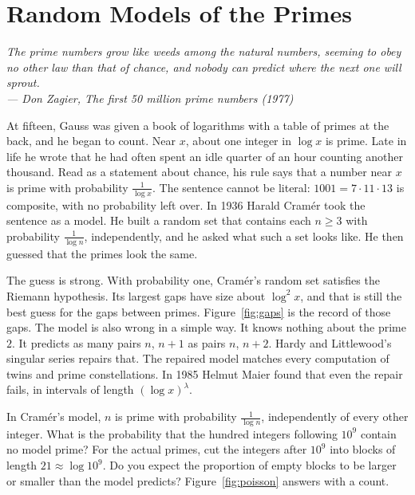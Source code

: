 \chapter{Random Models of the Primes}\label{ch:random}

\begin{center}\itshape
The prime numbers grow like weeds among the natural numbers, seeming to obey no other law than that of chance, and nobody can predict where the next one will sprout.\\
\upshape --- Don Zagier, \emph{The first 50 million prime numbers} (1977)
\end{center}

At fifteen, Gauss was given a book of logarithms with a table of primes at the back, and he began to count. Near $x$, about one integer in $\log x$ is prime. Late in life he wrote that he had often spent an idle quarter of an hour counting another thousand. Read as a statement about chance, his rule says that a number near $x$ is prime with probability $\frac1{\log x}$. The sentence cannot be literal: $1001=7\cdot11\cdot13$ is composite, with no probability left over. In 1936 Harald Cramér took the sentence as a model. He built a random set that contains each $n\ge3$ with probability $\frac1{\log n}$, independently, and he asked what such a set looks like. He then guessed that the primes look the same.

The guess is strong. With probability one, Cramér's random set satisfies the Riemann hypothesis. Its largest gaps have size about $\log^2 x$, and that is still the best guess for the gaps between primes. Figure~\ref{fig:gaps} is the record of those gaps. The model is also wrong in a simple way. It knows nothing about the prime $2$. It predicts as many pairs $n$, $n+1$ as pairs $n$, $n+2$. Hardy and Littlewood's singular series repairs that. The repaired model matches every computation of twins and prime constellations. In 1985 Helmut Maier found that even the repair fails, in intervals of length $(\log x)^\lambda$.

\begin{think}
In Cramér's model, $n$ is prime with probability $\frac1{\log n}$, independently of every other integer. What is the probability that the hundred integers following $10^{9}$ contain no model prime? For the actual primes, cut the integers after $10^9$ into blocks of length $21\approx\log10^9$. Do you expect the proportion of empty blocks to be larger or smaller than the model predicts? Figure~\ref{fig:poisson} answers with a count.
\end{think}

